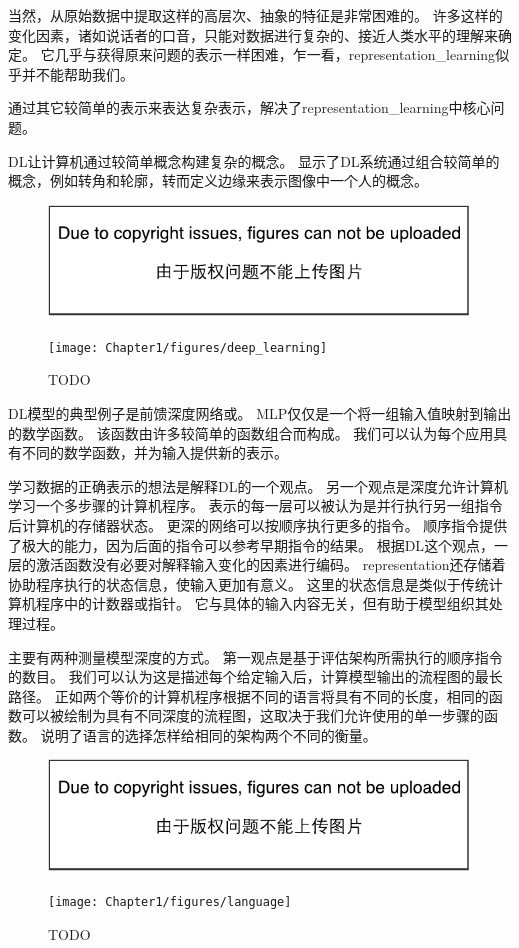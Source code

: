 当然，从原始数据中提取这样的高层次、抽象的特征是非常困难的。
许多这样的变化因素，诸如说话者的口音，只能对数据进行复杂的、接近人类水平的理解来确定。
它几乎与获得原来问题的表示一样困难，乍一看，\gls{representation_learning}似乎并不能帮助我们。

通过其它较简单的表示来表达复杂表示，解决了\gls{representation_learning}中核心问题。

\gls{DL}让计算机通过较简单概念构建复杂的概念。
显示了\gls{DL}系统通过组合较简单的概念，例如转角和轮廓，转而定义边缘来表示图像中一个人的概念。
\begin{figure}[!htb]
\ifOpenSource
\centerline{\includegraphics{figure.pdf}}
\else
\centerline{\texttt{[image: Chapter1/figures/deep\_learning]}}
\fi
\caption{TODO}
\label{fig:chap1_deep_learning}
\end{figure}
\gls{DL}模型的典型例子是前馈深度网络或。
\gls{MLP}仅仅是一个将一组输入值映射到输出的数学函数。
该函数由许多较简单的函数组合而构成。
我们可以认为每个应用具有不同的数学函数，并为输入提供新的表示。

学习数据的正确表示的想法是解释\gls{DL}的一个观点。
另一个观点是深度允许计算机学习一个多步骤的计算机程序。
表示的每一层可以被认为是并行执行另一组指令后计算机的存储器状态。
更深的网络可以按顺序执行更多的指令。
顺序指令提供了极大的能力，因为后面的指令可以参考早期指令的结果。
根据\gls{DL}这个观点，一层的激活函数没有必要对解释输入变化的因素进行编码。
\gls{representation}还存储着协助程序执行的状态信息，使输入更加有意义。
这里的状态信息是类似于传统计算机程序中的计数器或指针。
它与具体的输入内容无关，但有助于模型组织其处理过程。


主要有两种测量模型深度的方式。
第一观点是基于评估架构所需执行的顺序指令的数目。
我们可以认为这是描述每个给定输入后，计算模型输出的流程图的最长路径。
正如两个等价的计算机程序根据不同的语言将具有不同的长度，相同的函数可以被绘制为具有不同深度的流程图，这取决于我们允许使用的单一步骤的函数。
说明了语言的选择怎样给相同的架构两个不同的衡量。
\begin{figure}[!htb]
\ifOpenSource
\centerline{\includegraphics{figure.pdf}}
\else
\centerline{\texttt{[image: Chapter1/figures/language]}}
\fi
\caption{TODO}
\label{fig:chap1_language}
\end{figure}

